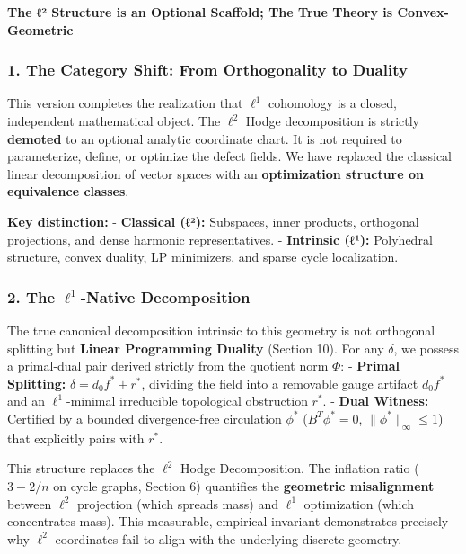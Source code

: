 \documentclass[
]{article}
\begin{document}
\textbf{The ℓ² Structure is an Optional Scaffold; The True Theory is
Convex-Geometric}

\subsubsection{1. The Category Shift: From Orthogonality to
Duality}\label{the-category-shift-from-orthogonality-to-duality}

This version completes the realization that \(\ell^1\) cohomology is a
closed, independent mathematical object. The \(\ell^2\) Hodge
decomposition is strictly \textbf{demoted} to an optional analytic
coordinate chart. It is not required to parameterize, define, or
optimize the defect fields. We have replaced the classical linear
decomposition of vector spaces with an \textbf{optimization structure on
equivalence classes}.

\textbf{Key distinction:} - \textbf{Classical (ℓ²):} Subspaces, inner
products, orthogonal projections, and dense harmonic representatives. -
\textbf{Intrinsic (ℓ¹):} Polyhedral structure, convex duality, LP
minimizers, and sparse cycle localization.

\subsubsection{\texorpdfstring{2. The \(\ell^1\)-Native
Decomposition}{2. The \textbackslash ell\^{}1-Native Decomposition}}\label{the-ell1-native-decomposition}

The true canonical decomposition intrinsic to this geometry is not
orthogonal splitting but \textbf{Linear Programming Duality} (Section
10). For any \(\delta\), we possess a primal-dual pair derived strictly
from the quotient norm \(\Phi\): - \textbf{Primal Splitting:}
\(\delta = d_0 f^* + r^*\), dividing the field into a removable gauge
artifact \(d_0 f^*\) and an \(\ell^1\)-minimal irreducible topological
obstruction \(r^*\). - \textbf{Dual Witness:} Certified by a bounded
divergence-free circulation \(\phi^*\) (\(B^T \phi^* = 0\),
\(\|\phi^*\|_\infty \leq 1\)) that explicitly pairs with \(r^*\).

This structure replaces the \(\ell^2\) Hodge Decomposition. The
inflation ratio (\(3 - 2/n\) on cycle graphs, Section 6) quantifies the
\textbf{geometric misalignment} between \(\ell^2\) projection (which
spreads mass) and \(\ell^1\) optimization (which concentrates mass).
This measurable, empirical invariant demonstrates precisely why
\(\ell^2\) coordinates fail to align with the underlying discrete
geometry.
\end{document}
